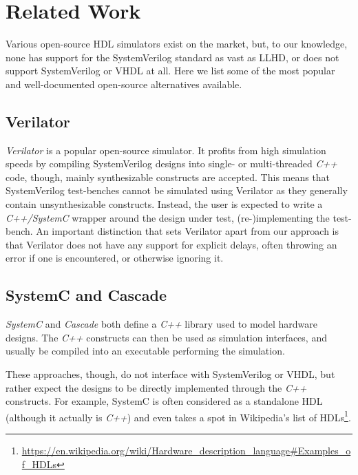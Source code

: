 \chapter{Related Work}
Various open-source HDL simulators exist on the market, but, to our knowledge, none has support for the SystemVerilog standard as vast as LLHD, or does not support SystemVerilog or VHDL at all. Here we list some of the most popular and well-documented open-source alternatives available.


\section{Verilator}
\textit{Verilator} \cite{verilator} is a popular open-source simulator. It profits from high simulation speeds by compiling SystemVerilog designs into single- or multi-threaded \textit{C++} code, though, mainly synthesizable constructs are accepted. This means that SystemVerilog test-benches cannot be simulated using Verilator as they generally contain unsynthesizable constructs. Instead, the user is expected to write a \textit{C++/SystemC} wrapper around the design under test, (re-)implementing the test-bench. An important distinction that sets Verilator apart from our approach is that Verilator does not have any support for explicit delays, often throwing an error if one is encountered, or otherwise ignoring it.


\section{SystemC and Cascade}
\textit{SystemC} \cite{systemc} and \textit{Cascade} \cite{Grossman2013}  both define a \textit{C++} library used to model hardware designs. The \textit{C++} constructs can then be used as simulation interfaces, and usually be compiled into an executable performing the simulation.

These approaches, though, do not interface with SystemVerilog or VHDL, but rather expect the designs to be directly implemented through the \textit{C++} constructs. For example, SystemC is often considered as a standalone HDL (although it actually is \textit{C++}) and even takes a spot in Wikipedia's list of HDLs\footnote{\url{https://en.wikipedia.org/wiki/Hardware_description_language\#Examples_of_HDLs}}.

